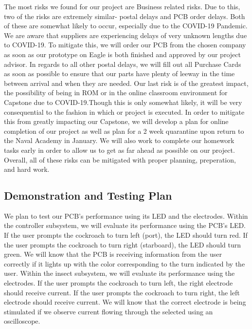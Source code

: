 \documentclass{article}
\begin{document}
\par The most risks we found for our project are Business related risks. Due to this, two of the risks are extremely similar- postal delays and PCB order delays. Both of these are somewhat likely to occur, especially due to the COVID-19 Pandemic. We are aware that suppliers are experiencing delays of very unknown lengths due to COVID-19. To mitigate this, we will order our PCB from the chosen company as soon as our prototype on Eagle is both finished and approved by our project advisor. In regards to all other postal delays, we will fill out all Purchase Cards as soon as possible to ensure that our parts have plenty of leeway in the time between arrival and when they are needed. Our last risk is of the greatest impact, the possibility of being in ROM or in the online classroom environment for Capstone due to COVID-19.Though this is only somewhat likely, it will be very consequential to the fashion in which or project is executed. In order to mitigate this from greatly impacting our Capstone, we will develop a plan for online completion of our project as well as plan for a 2 week quarantine upon return to the Naval Academy in January. We will also work to complete our homework tasks early in order to allow us to get as far ahead as possible on our project. Overall, all of these risks can be mitigated with proper planning, preperation, and hard work.



\subsection{Demonstration and Testing Plan}

\par We plan to test our PCB's performance using its LED and the electrodes. Within the controller subsystem, we will evaluate its performance using the PCB's LED. If the user prompts the cockroach to turn left (port), the LED should turn red. If the user prompts the cockroach to turn right (starboard), the LED should turn green. We will know that the PCB is receiving information from the user correctly if it lights up with the color corresponding to the turn indicated by the user. Within the insect subsystem, we will evaluate its performance using the electrodes. If the user prompts the cockroach to turn left, the right electrode should receive current. If the user prompts the cockroach to turn right, the left electrode should receive current. We will know that the correct electrode is being stimulated if we observe current flowing through the selected using an oscilloscope.
\end{document}
